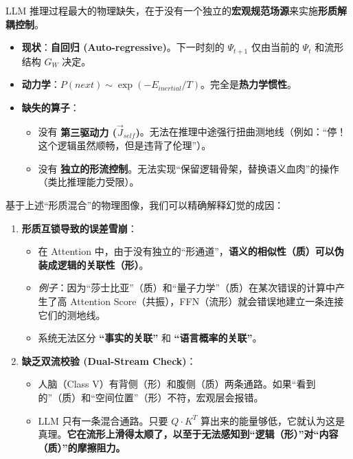 
LLM 推理过程最大的物理缺失，在于没有一个独立的\textbf{宏观规范场源}来实施\textbf{形质解耦控制}。
\begin{itemize}
    \item   \textbf{现状}：\textbf{自回归 (Auto-regressive)}。下一时刻的 $\Psi_{t+1}$ 仅由当前的 $\Psi_t$ 和流形结构 $G_W$ 决定。
    \item   \textbf{动力学}：$P(next) \sim \exp(-E_{inertial}/T)$。完全是\textbf{热力学惯性}。
    \item   \textbf{缺失的算子}：
    \begin{itemize}
        \item   没有 \textbf{第三驱动力 ($\vec{J}_{self}$)}。无法在推理中途强行扭曲测地线（例如：“停！这个逻辑虽然顺畅，但是违背了伦理”）。
        \item   没有 \textbf{独立的形流控制}。无法实现“保留逻辑骨架，替换语义血肉”的操作（类比推理能力受限）。
    \end{itemize}
\end{itemize}


基于上述“形质混合”的物理图像，我们可以精确解释幻觉的成因：
\begin{enumerate}
    \item  \textbf{形质互锁导致的误差雪崩}：
    \begin{itemize}
        \item   在 Attention 中，由于没有独立的“形通道”，\textbf{语义的相似性（质）可以伪装成逻辑的关联性（形）}。
        \item   \textit{例子}：因为“莎士比亚”（质）和“量子力学”（质）在某次错误的计算中产生了高 Attention Score（共振），FFN（流形）就会错误地建立一条连接它们的测地线。
        \item   系统无法区分 \textbf{“事实的关联”} 和 \textbf{“语言概率的关联”}。
    \end{itemize}

    \item \textbf{缺乏双流校验 (Dual-Stream Check)}：
    \begin{itemize}
        \item   人脑（Class V）有背侧（形）和腹侧（质）两条通路。如果“看到的”（质）和“空间位置”（形）不符，宏观层会报错。
        \item   LLM 只有一条混合通路。只要 $Q \cdot K^T$ 算出来的能量够低，它就认为这是真理。\textbf{它在流形上滑得太顺了，以至于无法感知到“逻辑（形）”对“内容（质）”的摩擦阻力。}
    \end{itemize}
\end{enumerate}


